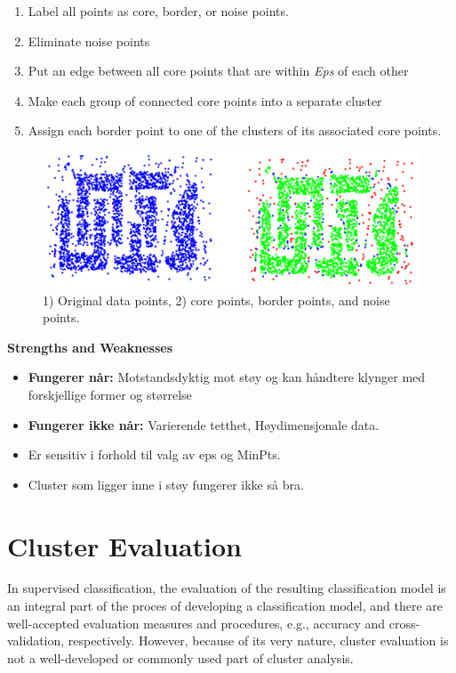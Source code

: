 			\begin{enumerate}
				\item Label all points as core, border, or noise points.
				\item Eliminate noise points
				\item Put an edge between all core points that are within {\it Eps} of each other
				\item Make each group of connected core points into a separate cluster
				\item Assign each border point to one of the clusters of its associated core points.
			\end{enumerate}

			\begin{figure}[H]
				\centering
				\includegraphics[scale=0.5]{pics/dbscan2.png}
				\caption{1) Original data points, 2) {\color{green}core points}, {\color{blue}border points}, and
				{\color{red}noise points}.}
			\end{figure}

			{\bf Strengths and Weaknesses}
				\begin{itemize}
					\item {\bf Fungerer når:} Motstandsdyktig mot støy og kan håndtere klynger med forskjellige former 
					og størrelse
					\item {\bf Fungerer ikke når:} Varierende tetthet, Høydimensjonale data.
					\item Er sensitiv i forhold til valg av eps og MinPts.
					\item Cluster som ligger inne i støy fungerer ikke så bra. 
				\end{itemize}

	\clearpage
	\section{Cluster Evaluation}

		In supervised classification, the evaluation of the resulting classification model
		is an integral part of the proces of developing a classification model, and
		there are well-accepted evaluation measures and procedures, e.g., accuracy
		and cross-validation, respectively. However, because of its very nature, cluster
		evaluation is not a well-developed or commonly used part of cluster analysis.

